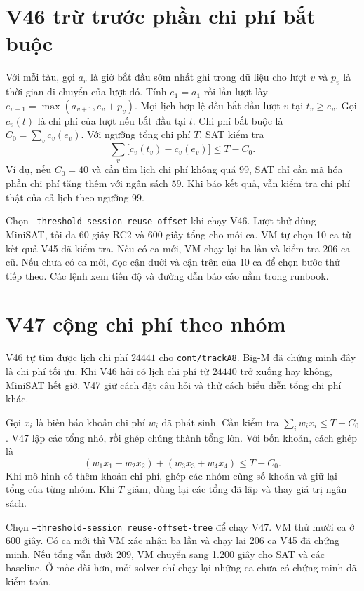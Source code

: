 \documentclass[11pt,a4paper]{article}
\newcommand{\code}[1]{\texttt{#1}}
\begin{document}
\section{V46 trừ trước phần chi phí bắt buộc}

Với mỗi tàu, gọi $a_v$ là giờ bắt đầu sớm nhất ghi trong dữ liệu
cho lượt $v$ và $p_v$ là thời gian di chuyển của lượt đó. Tính
$e_1=a_1$ rồi lần lượt lấy $e_{v+1}=\max(a_{v+1},e_v+p_v)$.
Mọi lịch hợp lệ đều bắt đầu lượt $v$ tại $t_v\ge e_v$.
Gọi $c_v(t)$ là chi phí của lượt nếu bắt đầu tại $t$. Chi phí bắt buộc là
$C_0=\sum_v c_v(e_v)$. Với ngưỡng tổng chi phí $T$, SAT kiểm tra
\[
  \sum_v \bigl[c_v(t_v)-c_v(e_v)\bigr]\le T-C_0.
\]
Ví dụ, nếu $C_0=40$ và cần tìm lịch chi phí không quá $99$,
SAT chỉ cần mã hóa phần chi phí tăng thêm với ngân sách $59$.
Khi báo kết quả, vẫn kiểm tra chi phí thật của cả lịch theo ngưỡng $99$.

Chọn \code{--threshold-session reuse-offset} khi chạy V46. Lượt
thử dùng MiniSAT, tối đa 60 giây RC2 và 600 giây tổng cho mỗi ca.
VM tự chọn 10 ca từ kết quả V45 đã kiểm tra. Nếu có ca mới, VM
chạy lại ba lần và kiểm tra 206 ca cũ. Nếu chưa có ca mới, đọc cận
dưới và cận trên của 10 ca để chọn bước thử tiếp theo. Các lệnh xem
tiến độ và đường dẫn báo cáo nằm trong runbook.

\section{V47 cộng chi phí theo nhóm}

V46 tự tìm được lịch chi phí $24441$ cho \code{cont/trackA8}.
Big-M đã chứng minh đây là chi phí tối ưu. Khi V46 hỏi có lịch
chi phí từ $24440$ trở xuống hay không, MiniSAT hết giờ. V47 giữ
cách đặt câu hỏi và thử cách biểu diễn tổng chi phí khác.

Gọi $x_i$ là biến báo khoản chi phí $w_i$ đã phát sinh. Cần kiểm
tra $\sum_i w_ix_i\le T-C_0$. V47 lập các tổng nhỏ, rồi ghép
chúng thành tổng lớn. Với bốn khoản, cách ghép là
\[
 (w_1x_1+w_2x_2)+(w_3x_3+w_4x_4)\le T-C_0.
\]
Khi mô hình có thêm khoản chi phí, ghép các nhóm cùng số khoản
và giữ lại tổng của từng nhóm. Khi $T$ giảm, dùng lại các tổng đã
lập và thay giá trị ngân sách.

Chọn \code{--threshold-session reuse-offset-tree} để chạy V47.
VM thử mười ca ở 600 giây. Có ca mới thì VM xác nhận ba lần và
chạy lại 206 ca V45 đã chứng minh. Nếu tổng vẫn dưới 209, VM
chuyển sang 1.200 giây cho SAT và các baseline. Ở mốc dài hơn,
mỗi solver chỉ chạy lại những ca chưa có chứng minh đã kiểm toán.
\end{document}
